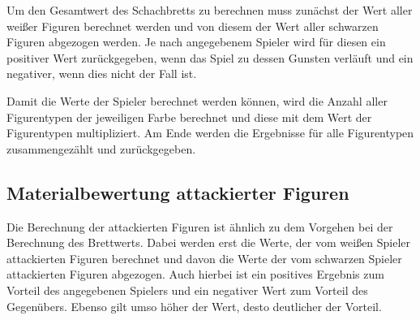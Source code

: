     Um den Gesamtwert des Schachbretts zu berechnen muss zunächst der Wert
aller weißer Figuren berechnet werden und von diesem der Wert aller
schwarzen Figuren abgezogen werden. Je nach angegebenem Spieler wird für
diesen ein positiver Wert zurückgegeben, wenn das Spiel zu dessen
Gunsten verläuft und ein negativer, wenn dies nicht der Fall ist.

Damit die Werte der Spieler berechnet werden können, wird die Anzahl
aller Figurentypen der jeweiligen Farbe berechnet und diese mit dem Wert
der Figurentypen multipliziert. Am Ende werden die Ergebnisse für alle
Figurentypen zusammengezählt und zurückgegeben.

    \subsection{Materialbewertung attackierter
Figuren}\label{materialbewertung-attackierter-figuren}

Die Berechnung der attackierten Figuren ist ähnlich zu dem Vorgehen bei
der Berechnung des Brettwerts. Dabei werden erst die Werte, der vom
weißen Spieler attackierten Figuren berechnet und davon die Werte der
vom schwarzen Spieler attackierten Figuren abgezogen. Auch hierbei ist
ein positives Ergebnis zum Vorteil des angegebenen Spielers und ein
negativer Wert zum Vorteil des Gegenübers. Ebenso gilt umso höher der
Wert, desto deutlicher der Vorteil.

